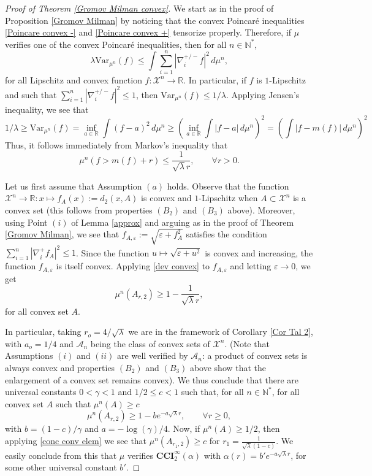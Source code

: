 \documentclass[11pt]{amsart}
\numberwithin{equation}{section}
\begin{document}
\begin{proof}[Proof of Theorem \ref{Gromov Milman convex}] 
We start as in the proof of Proposition \ref{Gromov Milman} by noticing that the convex Poincar\'e inequalities \eqref{Poincare convex -} and \eqref{Poincare convex +} tensorize properly.  
Therefore, if $\mu$ verifies one of the convex Poincar\'e inequalities, then for all $n\in {\mathbb{N}}^*$, 
\[
\lambda\mathrm{Var}_{\mu^n}(f)\leq \int \sum_{i=1}^n|\nabla_i^{+/-}f|^2\,d\mu^n,
\]
for all Lipschitz and convex function $f:{\mathcal{X}}^n\to{\mathbb{R}}$. In particular, if $f$ is $1$-Lipschitz and such that $\sum_{i=1}^n|\nabla_i^{+/-}f|^2\leq 1$, then $\mathrm{Var}_{\mu^n}(f)\leq 1/\lambda$.
Applying Jensen's inequality, we see that
\[
1/\lambda\geq \mathrm{Var}_{\mu^n}(f)=\inf_{a\in {\mathbb{R}}}\int (f-a)^2\,d\mu^n\geq \left(\inf_{a\in {\mathbb{R}}}\int |f-a|\,d\mu^n\right)^2=\left(\int |f-m(f)|\,d\mu^n\right)^2
\]
Thus, it follows immediately from Markov's inequality that 
\begin{equation}\label{dev convex}
\mu^n\left(f>m(f)+r\right)\leq \frac{1}{\sqrt{\lambda}r},\qquad \forall r>0.
\end{equation}

Let us first assume that Assumption $(a)$ holds.
Observe that the function ${\mathcal{X}}^n\to{\mathbb{R}}:x \mapsto f_A(x):=d_2(x,A)$
is convex and $1$-Lipschitz when $A\subset{\mathcal{X}}^n$ is a convex set (this follows from properties $(B_2)$ and $(B_3)$ above). Moreover,
using Point $(i)$ of Lemma \ref{approx} and arguing as in the proof of Theorem \ref{Gromov Milman}, we see that $f_{A,\varepsilon}:=\sqrt{\varepsilon+f_A^2}$ satisfies the condition $\sum_{i=1}^n|\nabla_i^{+}f_A|^2\leq 1$. Since the function $u\mapsto \sqrt{\varepsilon+u^2}$ is convex and increasing, the function 
$f_{A,\varepsilon}$ is itself convex. Applying \eqref{dev convex} to $f_{A,\varepsilon}$ and letting $\varepsilon\to 0$, we get
\begin{equation}\label{conc conv elem}
\mu^n(A_{r,2})\geq 1-\frac{1}{\sqrt{\lambda}r},
\end{equation}
for all convex set $A.$ 

In particular, taking $r_o=4/\sqrt{\lambda}$ we are in the framework of Corollary \ref{Cor Tal 2}, with $a_o=1/4$ and $\mathcal{A}_n$ being the class of convex sets of ${\mathcal{X}}^n.$ (Note that Assumptions $(i)$ and $(ii)$ are well verified by $\mathcal{A}_n$: a product of convex sets is always convex and properties $(B_2)$ and $(B_3)$ above show that the enlargement of a convex set remains convex). We thus conclude that there are universal constants $0<\gamma<1$ and $1/2\leq c<1$ such that, for all $n\in{\mathbb{N}}^*$, for all convex set $A$ such that $\mu^n(A)\geq c$
\[
\mu^n(A_{r,2})\geq 1-be^{-a\sqrt{\lambda}r},\qquad \forall r\geq 0,
\]
with $b=(1-c)/\gamma$ and $a=-\log(\gamma)/4$. 
Now, if $\mu^n(A)\geq 1/2$, then applying \eqref{conc conv elem} we see that $\mu^n(A_{r_1,2})\geq c$ for $r_1=\frac{1}{\sqrt{\lambda}(1-c)}$. We easily conclude from this that $\mu$ verifies $\mathbf{CCI}_2^\infty(\alpha)$ with $\alpha(r)=b'e^{-a\sqrt{\lambda}r}$, for some other universal constant $b'$.


\end{proof}
\end{document}
